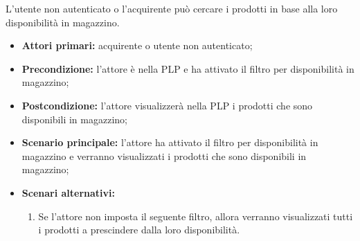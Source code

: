 L'utente non autenticato o l'acquirente può cercare i prodotti in base alla loro disponibilità in magazzino.
\begin{itemize}
    \item \textbf{Attori primari:} acquirente o utente non autenticato;
    \item \textbf{Precondizione:} l'attore è nella PLP e ha attivato il filtro per disponibilità in magazzino;
    \item \textbf{Postcondizione:} l'attore visualizzerà nella PLP i prodotti che sono disponibili in magazzino;
    \item \textbf{Scenario principale:} l'attore ha attivato il filtro per disponibilità in magazzino e verranno visualizzati i prodotti che sono disponibili in magazzino;
    \item \textbf{Scenari alternativi:}
    \begin{enumerate}[label=\lett]
        \item Se l'attore non imposta il seguente filtro, allora verranno visualizzati tutti i prodotti a prescindere dalla loro disponibilità.
    \end{enumerate}
\end{itemize}
